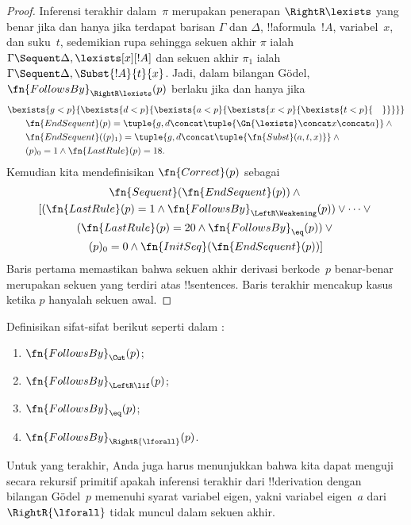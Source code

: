 \documentclass[../../../include/open-logic-section]{subfiles}
\begin{document}
\begin{proof}
Inferensi terakhir dalam~$\pi$ merupakan penerapan $\RightR\lexists$ yang
benar jika dan hanya jika terdapat barisan $\Gamma$ dan $\Delta$,
!!a{formula}~$!A$, variabel~$x$, dan suku~$t$, sedemikian rupa sehingga sekuen
akhir $\pi$ ialah $\Gamma \Sequent \Delta, \lexists[x][!A]$ dan sekuen akhir
$\pi_1$ ialah $\Gamma \Sequent \Delta, \Subst{!A}{t}{x}$. Jadi, dalam bilangan
G\"odel, $\fn{FollowsBy}_{\RightR\lexists}(p)$ berlaku jika dan hanya jika
\begin{align*}
  & \bexists{g<p}{\bexists{d<p}{\bexists{a<p}{\bexists{x<p}{\bexists{t<p}{\quad}}}}}\\
  & \qquad \fn{EndSequent}(p) =
  \tuple{
    g,
    d \concat \tuple{\Gn{\lexists} \concat x \concat a}
  } \land {}\\
  & \qquad \fn{EndSequent}((p)_1) =
  \tuple{
    g,
    d \concat \tuple{\fn{Subst}(a, t, x)}
  } \land {}\\
  & \qquad (p)_0 = 1 \land \fn{LastRule}(p) = 18.
\end{align*}
Kemudian kita mendefinisikan $\fn{Correct}(p)$ sebagai
\begin{multline*}
  \fn{Sequent}(\fn{EndSequent}(p)) \land {}\\
  [(\fn{LastRule}(p) = 1 \land
  \fn{FollowsBy}_{\LeftR\Weakening}(p)) \lor \dots \lor {}\\
  (\fn{LastRule}(p) = 20 \land \fn{FollowsBy}_{\eq}(p)) \lor {}\\
  (p)_0 = 0 \land \fn{InitSeq}(\fn{EndSequent}(p))]
\end{multline*}
Baris pertama memastikan bahwa sekuen akhir derivasi berkode~$p$ benar-benar merupakan sekuen
yang terdiri atas !!{sentence}s. Baris terakhir mencakup kasus ketika $p$
hanyalah sekuen awal.
\end{proof}

\begin{prob}
  Definisikan sifat-sifat berikut seperti dalam
  :
  \begin{enumerate}
  \item $\fn{FollowsBy}_{\Cut}(p)$;
  \item $\fn{FollowsBy}_{\LeftR\lif}(p)$;
  \item $\fn{FollowsBy}_{\eq}(p)$;
  \item $\fn{FollowsBy}_{\RightR{\lforall}}(p)$.
  \end{enumerate}
  Untuk yang terakhir, Anda juga harus menunjukkan bahwa kita dapat menguji
  secara rekursif primitif apakah inferensi terakhir dari !!{derivation}
  dengan bilangan G\"odel~$p$ memenuhi syarat variabel eigen, yakni variabel
  eigen~$a$ dari $\RightR{\lforall}$ tidak muncul dalam sekuen akhir.
\end{prob}
\end{document}
